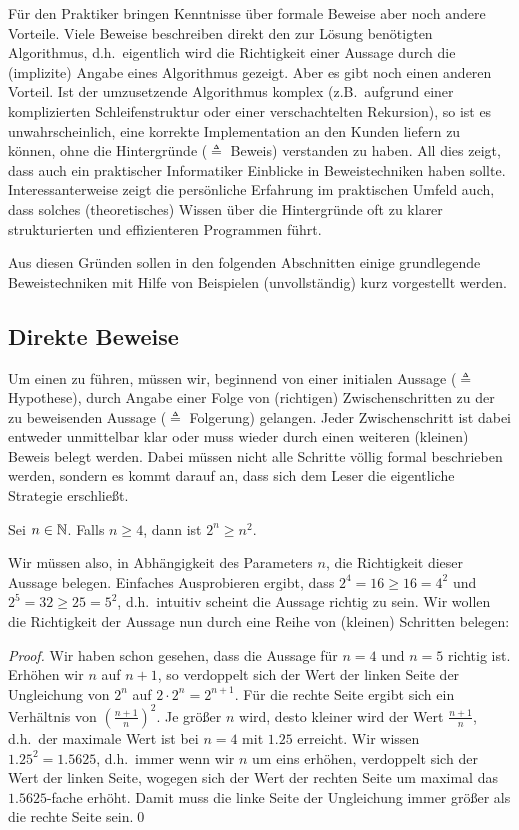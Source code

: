 Für den Praktiker bringen Kenntnisse über formale Beweise aber noch
andere Vorteile. Viele Beweise beschreiben direkt den zur Lösung
benötigten Algorithmus, d.h.~eigentlich wird die Richtigkeit einer
Aussage durch die (implizite) Angabe eines Algorithmus gezeigt. Aber
es gibt noch einen anderen Vorteil. Ist der umzusetzende Algorithmus
komplex (z.B.~aufgrund einer komplizierten Schleifenstruktur oder
einer verschachtelten Rekursion), so ist es unwahrscheinlich, eine
korrekte Implementation an den Kunden liefern zu können, ohne die
Hintergründe ($\triangleq$ Beweis) verstanden zu haben. All dies
zeigt, dass auch ein praktischer Informatiker Einblicke in
Beweistechniken haben sollte. Interessanterweise zeigt die persönliche
Erfahrung im praktischen Umfeld auch, dass solches (theoretisches)
Wissen über die Hintergründe oft zu klarer strukturierten und
effizienteren Programmen führt.

Aus diesen Gründen sollen in den folgenden Abschnitten einige
grundlegende Beweistechniken mit Hilfe von Beispielen (unvollständig)
kurz vorgestellt werden.

\subsection{Direkte Beweise}
Um einen  zu führen,
müssen wir, beginnend von einer initialen Aussage ($\triangleq$
Hypothese), durch Angabe einer Folge von (richtigen) Zwischenschritten
zu der zu beweisenden Aussage ($\triangleq$ Folgerung) gelangen. Jeder
Zwischenschritt ist dabei entweder unmittelbar klar oder muss wieder
durch einen weiteren (kleinen) Beweis belegt werden. Dabei müssen
nicht alle Schritte völlig formal beschrieben werden, sondern es kommt
darauf an, dass sich dem Leser die eigentliche Strategie erschließt.

\goodbreak
\begin{theorem}
\label{ExpoGTSquare}
Sei $n \in \mathbb N$. Falls $n \ge 4$, dann ist $2^n \ge n^2$.
\end{theorem}

Wir müssen also, in Abhängigkeit des Parameters $n$, die Richtigkeit
dieser Aussage belegen. Einfaches Ausprobieren ergibt, dass $2^4 = 16
\ge 16 = 4^2$ und $2^5 = 32 \ge 25 = 5^2$, d.h.~intuitiv scheint die
Aussage richtig zu sein. Wir wollen die Richtigkeit der Aussage nun
durch eine Reihe von (kleinen) Schritten belegen:

\begin{proof}

Wir haben schon gesehen, dass die Aussage für $n = 4$ und $n = 5$
richtig ist. Erhöhen wir $n$ auf $n + 1$, so verdoppelt sich der Wert
der linken Seite der Ungleichung von $2^n$ auf $2 \cdot 2^n =
2^{n+1}$. Für die rechte Seite ergibt sich ein Verhältnis von
$(\frac{n+1}{n})^2$. Je größer $n$ wird, desto kleiner wird der Wert
$\frac{n+1}{n}$, d.h.~der maximale Wert ist bei $n = 4$ mit $1.25$
erreicht. Wir wissen $1.25^2 = 1.5625$, d.h.~immer wenn wir $n$ um
eins erhöhen, verdoppelt sich der Wert der linken Seite, wogegen sich
der Wert der rechten Seite um maximal das $1.5625$-fache erhöht. Damit
muss die linke Seite der Ungleichung immer größer als die rechte Seite
sein.\qed
\end{proof}

